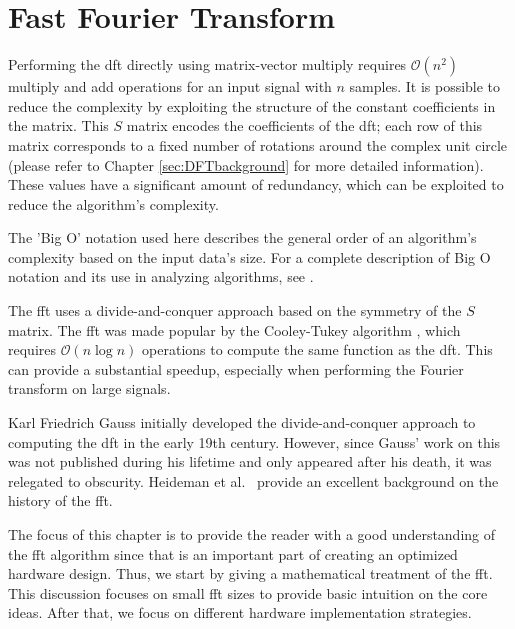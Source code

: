 
\chapter{Fast Fourier Transform}
\glsresetall
\label{chapter:fft}

Performing the \gls{dft} directly using matrix-vector multiply requires $\mathcal{O}(n^2)$ multiply and add operations for an input signal with $n$ samples.  It is possible to reduce the complexity by exploiting the structure of the constant coefficients in the matrix.  This $S$ matrix encodes the coefficients of the \gls{dft}; each row of this matrix corresponds to a fixed number of rotations around the complex unit circle (please refer to Chapter \ref{sec:DFTbackground} for more detailed information). These values have a significant amount of redundancy, which can be exploited to reduce the algorithm's complexity. 

\begin{aside}
The 'Big O' notation used here describes the general order of an algorithm's complexity based on the input data's size.  For a complete description of Big O notation and its use in analyzing algorithms, see \cite{CLR}.
\end{aside}

The \gls{fft} uses a divide-and-conquer approach based on the symmetry of the $S$ matrix.  The \gls{fft} was made popular by the Cooley-Tukey algorithm \cite{cooley65}, which requires $\mathcal{O}(n \log n)$ operations to compute the same function as the \gls{dft}.  This can provide a substantial speedup, especially when performing the Fourier transform on large signals. %

\begin{aside}
Karl Friedrich Gauss initially developed the divide-and-conquer approach to computing the \gls{dft} in the early 19th century. However, since Gauss' work on this was not published during his lifetime and only appeared after his death, it was relegated to obscurity.  Heideman et al.~\cite{heideman84} provide an excellent background on the history of the \gls{fft}.
\end{aside}

The focus of this chapter is to provide the reader with a good understanding of the \gls{fft} algorithm since that is an important part of creating an optimized hardware design. Thus, we start by giving a mathematical treatment of the \gls{fft}. This discussion focuses on small \gls{fft} sizes to provide basic intuition on the core ideas. After that, we focus on different hardware implementation strategies.

